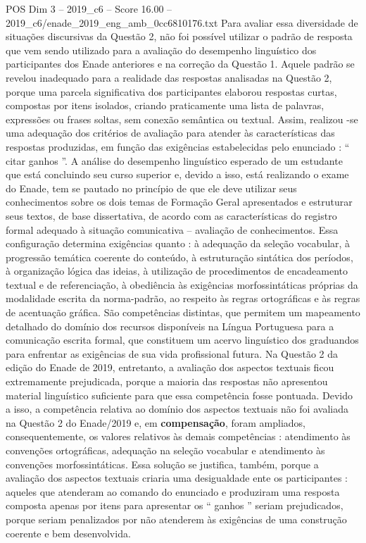 \begin{textsample}{POS Dim 3 – 2019\_c6 – Score 16.00 – 2019\_c6/enade\_2019\_eng\_amb\_0cc6810176.txt}
Para avaliar essa diversidade de situações discursivas da Questão 2, não foi possível utilizar o padrão de resposta que vem sendo utilizado para a avaliação do desempenho linguístico dos participantes dos Enade anteriores e na correção da Questão 1.
Aquele padrão se revelou inadequado para a realidade das respostas analisadas na Questão 2, porque uma parcela significativa dos participantes elaborou respostas curtas, compostas por itens isolados, criando praticamente uma lista de palavras, expressões ou frases soltas, sem conexão semântica ou textual.
Assim, realizou -se uma adequação dos critérios de avaliação para atender às características das respostas produzidas, em função das exigências estabelecidas pelo enunciado : “ citar ganhos ”.
A análise do desempenho linguístico esperado de um estudante que está concluindo seu curso superior e, devido a isso, está realizando o exame do Enade, tem se pautado no princípio de que ele deve utilizar seus conhecimentos sobre os dois temas de Formação Geral apresentados e estruturar seus textos, de base dissertativa, de acordo com as características do registro formal adequado à situação comunicativa – avaliação de conhecimentos.
Essa configuração determina exigências quanto : à adequação da seleção vocabular, à progressão temática coerente do conteúdo, à estruturação sintática dos períodos, à organização lógica das ideias, à utilização de procedimentos de encadeamento textual e de referenciação, à obediência às exigências morfossintáticas próprias da modalidade escrita da norma-padrão, ao respeito às regras ortográficas e às regras de acentuação gráfica.
São competências distintas, que permitem um mapeamento detalhado do domínio dos recursos disponíveis na Língua Portuguesa para a comunicação escrita formal, que constituem um acervo linguístico dos graduandos para enfrentar as exigências de sua vida profissional futura.
Na Questão 2 da edição do Enade de 2019, entretanto, a avaliação dos aspectos textuais ficou extremamente prejudicada, porque a maioria das respostas não apresentou material linguístico suficiente para que essa competência fosse pontuada.
Devido a isso, a competência relativa ao domínio dos aspectos textuais não foi avaliada na Questão 2 do Enade/2019 e, em \textbf{compensação}, foram ampliados, consequentemente, os valores relativos às demais competências : atendimento às convenções ortográficas, adequação na seleção vocabular e atendimento às convenções morfossintáticas.
Essa solução se justifica, também, porque a avaliação dos aspectos textuais criaria uma desigualdade ente os participantes : aqueles que atenderam ao comando do enunciado e produziram uma resposta composta apenas por itens para apresentar os “ ganhos ” seriam prejudicados, porque seriam penalizados por não atenderem às exigências de uma construção coerente e bem desenvolvida.

\end{textsample}
